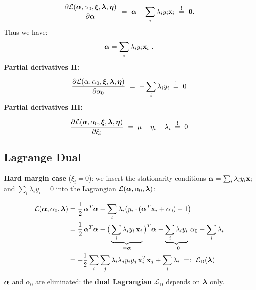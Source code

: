  \begin{displaymath}
    \frac{\partial  \mathcal L(\bm{\mathrm{\alpha}}, \alpha_0, \bm{\mathrm{\xi}}, \bm{\mathrm{\lambda}}, \bm{\mathrm{\eta}})}{\partial \bm{\mathrm{\alpha}}} ~=~ 
    \bm{\mathrm{\alpha}} - \sum_i \lambda_i y_i \bm{\mathrm{x}}_i ~\stackrel{!}{=}~ 
    \bm{\mathrm{0}}.
  \end{displaymath}
  Thus we have:
  \begin{displaymath}
    \bm{\mathrm{\alpha}} = \sum_i \lambda_i y_i \bm{\mathrm{x}}_i~.
  \end{displaymath}
  \textbf{Partial derivatives  II:}
  
  \begin{displaymath}
    \frac{\partial  \mathcal L(\bm{\mathrm{\alpha}}, \alpha_0, \bm{\mathrm{\xi}}, \bm{\mathrm{\lambda}}, \bm{\mathrm{\eta}})}{\partial \alpha_0} ~=~
   -\sum_i \lambda_i y_i ~\stackrel{!}{=}~ 
   0
  \end{displaymath}
  \textbf{Partial derivatives  III:}
  
  \begin{displaymath}
    \frac{\partial  \mathcal L(\bm{\mathrm{\alpha}}, \alpha_0, \bm{\mathrm{\xi}}, \bm{\mathrm{\lambda}}, \bm{\mathrm{\eta}})}{\partial \xi_i} ~=~ 
    \mu - \eta_i - \lambda_i ~\stackrel{!}{=}~ 
    0
  \end{displaymath}
  
\subsection{Lagrange Dual}
  \textbf{Hard margin case} ($\xi_i=0$): we insert the stationarity conditions 
  $\bm{\mathrm{\alpha}}=\sum_i\lambda_i y_i\bm{\mathrm{x}}_i$ and $\sum_i\lambda_i y_i=0$ into the Lagrangian $\mathcal L(\bm{\mathrm{\alpha}},\alpha_0,\bm{\mathrm{\lambda}})$:
  
  \begin{align*}
    \mathcal L(\bm{\mathrm{\alpha}},\alpha_0,\bm{\mathrm{\lambda}})
    &= \frac{1}{2}\,\bm{\mathrm{\alpha}}^T \bm{\mathrm{\alpha}} - \sum_i \lambda_i \big(y_i\cdot (\bm{\mathrm{\alpha}}^T\bm{\mathrm{x}}_i + \alpha_0) -1\big)\\
    &= \frac{1}{2}\,\bm{\mathrm{\alpha}}^T \bm{\mathrm{\alpha}} - \big(\underbrace{\sum_i \lambda_i y_i\, \bm{\mathrm{x}}_i}_{=\bm{\mathrm{\alpha}}}\big)^T \bm{\mathrm{\alpha}} - \underbrace{\sum_i \lambda_i y_i}_{=0}\,\alpha_0 + \sum_i \lambda_i\\
    &= -\frac{1}{2} \sum_i \sum_j \lambda_i \lambda_j y_i y_j \, \bm{\mathrm{x}}_i^T\bm{\mathrm{x}}_j +  \sum_i \lambda_i ~=:~ \mathcal L_\text{D}(\bm{\mathrm{\lambda}})
  \end{align*}
  $\bm{\mathrm{\alpha}}$ and $\alpha_0$ are eliminated: the \textbf{dual Lagrangian} $\mathcal L_\text{D}$ depends on $\bm{\mathrm{\lambda}}$ only.

